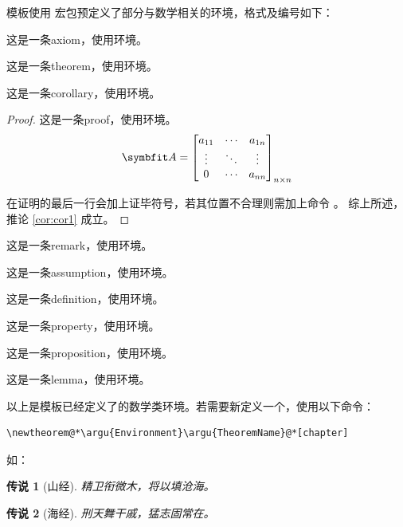 模板使用  宏包预定义了部分与数学相关的环境，格式及编号如下：
\begin{axiom}
	这是一条axiom，使用环境。
\end{axiom}
\begin{theorem}[某某定理]   %
	这是一条theorem，使用环境。
\end{theorem}
\begin{corollary}[一条推论]\label{cor:cor1}
	这是一条corollary，使用环境。
\end{corollary}
\begin{proof}
	这是一条proof，使用环境。
	\[
		\Matrix{A}=\begin{bmatrix}
			a_{11} & \cdots  & a_{1n} \\
			\vdots & \ddots & \vdots \\
			0      & \cdots & a_{nn}
		\end{bmatrix}_{n\times n}
	\]

	在证明的最后一行会加上证毕符号，若其位置不合理则需加上命令 。
	综上所述，推论 \ref{cor:cor1} 成立。
\end{proof}
\begin{remark}
	这是一条remark，使用环境。
\end{remark}
\begin{assumption}
	这是一条assumption，使用环境。
\end{assumption}
\begin{definition}
	这是一条definition，使用环境。
\end{definition}
\begin{property}
	这是一条property，使用环境。
\end{property}
\begin{proposition}
	这是一条proposition，使用环境。
\end{proposition}
\begin{lemma}
	这是一条lemma，使用环境。
\end{lemma}

以上是模板已经定义了的数学类环境。若需要新定义一个，使用以下命令：
\begin{lstlisting}[numbers=none]
\newtheorem@*\argu{Environment}\argu{TheoremName}@*[chapter]
		\end{lstlisting}
如：
\newtheorem{tale}{传说}[chapter]	%
\begin{tale}[山经]	  %
	精卫衔微木，将以填沧海。
\end{tale}
\begin{tale}[海经]
	刑天舞干戚，猛志固常在。
\end{tale}



